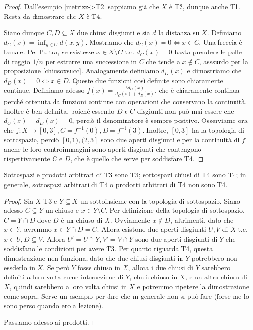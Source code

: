 \begin{proof}
  Dall'esempio \ref{metrizz->T2} sappiamo già che $X$ è T2, dunque anche T1. Resta da dimostrare che $X$ è T4.

  Siano dunque $C, D \subseteq X$ due chiusi disgiunti e sia $d$ la distanza su $X$. Definiamo $d_C(x)=\inf_{y \in C} d(x, y)$. Mostriamo che $d_C(x)=0 \Leftrightarrow x \in C$. Una freccia è banale. Per l'altra, se esistesse $x \in X \setminus C$ t.c. $d_C(x)=0$ basta prendere le palle di raggio $1/n$ per estrarre una successione in $C$ che tende a $ x \not\in C$, asssurdo per la proposizione \ref{chiusoxsucc}. Analogamente definiamo $d_D(x)$ e
  dimostriamo che $d_D(x)=0 \Leftrightarrow x \in D$. Queste due funzioni così definite sono chiaramente continue. Definiamo adesso $\displaystyle f(x)=\frac{3d_C(x)}{d_C(x)+d_D(x)}$, che è chiaramente continua perché ottenuta da funzioni continue con operazioni che conservano la continuità. Inoltre è ben definita, poiché essendo $D$ e $C$ disgiunti non può mai essere che $d_C(x)=d_D(x)=0$, perciò il denominatore è sempre positivo. Osserviamo ora che $f:X \rightarrow [0, 3], C=f^{-1}(0), D=f^{-1}(3)$. Inoltre, $[0, 3]$ ha la topologia di sottospazio, perciò $[0, 1), (2, 3]$ sono due aperti disgiunti e per la continuità di $f$ anche le loro controimmagini sono aperti disgiunti che contengono rispettivamente $C$ e $D$, che è quello che serve per soddisfare T4.
\end{proof}

\begin{prop}
  Sottospazi e prodotti arbitrari di T3 sono T3; sottospazi chiusi di T4 sono T4; in generale, sottospazi arbitrari di T4 o prodotti arbitrari di T4 non sono T4.
\end{prop}

\begin{proof}
  Sia $X$ T3 e $Y \subseteq X$ un sottoinsieme con la topologia di sottospazio. Siano adesso $C \subseteq Y$ un chiuso e $x \in Y \setminus C$. Per definizione della topologia di sottospazio, $C=Y \cap D$ dove $D$ è un chiuso di $X$. Ovviamente $x \not\in D$, altrimenti, dato che $x \in Y$, avremmo $x \in Y \cap D=C$. Allora esistono due aperti disgiunti $U, V$ di $X$ t.c. $x \in U, D \subseteq V$. Allora $U'=U \cap Y, V'=V \cap Y$ sono due aperti
  disgiunti di $Y$ che soddisfano le condizioni per avere T3. Per quanto riguarda T4, questa dimostrazione non funziona, dato che due chiusi disgiunti in $Y$ potrebbero non essderlo in $X$. Se però $Y$ fosse chiuso in $X$, allora i due chiusi di $Y$ sarebbero definiti a loro volta come intersezione di $Y$, che è chiuso in $X$, e un altro chiuso di $X$, quindi sarebbero a loro volta chiusi in $X$ e potremmo ripetere la dimostrazione come sopra. Serve un esempio per dire che in generale non si può fare (forse me lo sono perso quando ero a lezione). %

  Passiamo adesso ai prodotti.
\end{proof}
